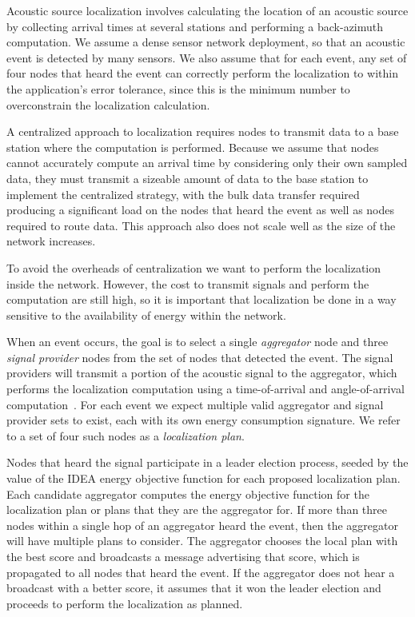 Acoustic source localization involves calculating the location of an acoustic
source by collecting arrival times at several stations and performing a
back-azimuth computation. We assume a dense sensor network deployment, so
that an acoustic event is detected by many sensors. We also assume that for
each event, any set of four nodes that heard the event can correctly perform
the localization to within the application's error tolerance, since this is
the minimum number to overconstrain the localization calculation.

A centralized approach to localization requires nodes to transmit data to a
base station where the computation is performed. Because we assume that nodes
cannot accurately compute an arrival time by considering only their own
sampled data, they must transmit a sizeable amount of data to the base
station to implement the centralized strategy, with the bulk data transfer
required producing a significant load on the nodes that heard the event as
well as nodes required to route data. This approach also does not scale well
as the size of the network increases.

To avoid the overheads of centralization we want to perform the localization
inside the network. However, the cost to transmit signals and perform the
computation are still high, so it is important that localization be done in a
way sensitive to the availability of energy within the network.

When an event occurs, the goal is to select a single \textit{aggregator} node
and three \textit{signal provider} nodes from the set of nodes that detected
the event. The signal providers will transmit a portion of the acoustic
signal to the aggregator, which performs the localization computation using a
time-of-arrival and angle-of-arrival computation~\cite{Niculescu03adhoc}. For
each event we expect multiple valid aggregator and signal provider sets to
exist, each with its own energy consumption signature. We refer to a set of
four such nodes as a \textit{localization plan}. 

Nodes that heard the signal participate in a leader election process, seeded
by the value of the IDEA energy objective function for each proposed
localization plan. Each candidate aggregator computes the energy objective
function for the localization plan or plans that they are the aggregator for.
If more than three nodes within a single hop of an aggregator heard the
event, then the aggregator will have multiple plans to consider. The
aggregator chooses the local plan with the best score and broadcasts a
message advertising that score, which is propagated to all nodes that heard
the event. If the aggregator does not hear a broadcast with a better score,
it assumes that it won the leader election and proceeds to perform the
localization as planned. 

